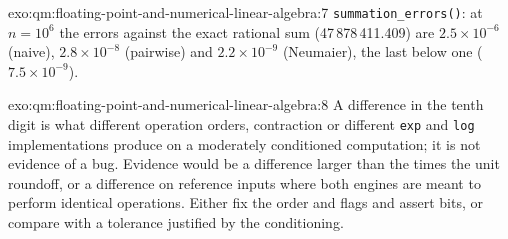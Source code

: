 \begin{solution}{exo:qm:floating-point-and-numerical-linear-algebra:7}
\texttt{summation\_errors()}: at $n = 10^6$ the errors against the exact rational sum (47\,878\,411.409) are $2.5 \times 10^{-6}$ (naive), $2.8 \times 10^{-8}$ (pairwise) and $2.2 \times 10^{-9}$
(Neumaier), the last below one  ($7.5 \times 10^{-9}$).
\end{solution}

\begin{solution}{exo:qm:floating-point-and-numerical-linear-algebra:8}
A difference in the tenth digit is what different operation orders,  contraction or different \texttt{exp} and \texttt{log} implementations produce on a moderately conditioned
computation; it is not evidence of a bug. Evidence would be a difference larger than the  times the unit roundoff, or a difference on reference inputs where both engines are meant
to perform identical operations. Either fix the order and flags and assert bits, or compare with a tolerance justified by the conditioning.
\end{solution}

